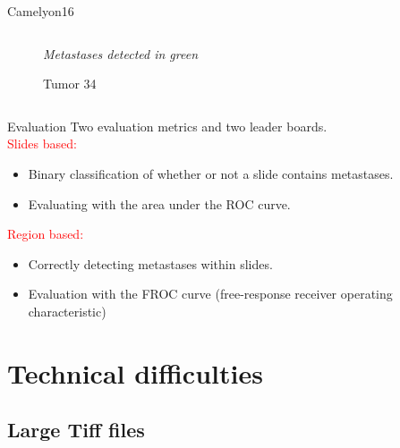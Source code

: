 \documentclass{beamer}
\begin{document}
\begin{frame}{Camelyon16}
\begin{columns}[T]
\begin{column}{.50\textwidth}
\begin{figure}[!ht]
\caption{Tumor 34}
{\footnotesize \textit{Metastases detected in green}}
\label{tumor_34}
\end{figure}
\end{column}%
\end{columns}

\end{frame}

\begin{frame}{Evaluation}
Two evaluation metrics and two leader boards. \\
\textcolor{red}{Slides based:}
\begin{itemize}
\item Binary classification of whether or not a slide contains metastases. \item Evaluating with the area under the ROC curve. 
\end{itemize}
\textcolor{red}{Region based:}
\begin{itemize}
\item Correctly detecting metastases within slides.
\item Evaluation with the FROC curve (free-response receiver operating characteristic)
\end{itemize}
\end{frame}

\section{Technical difficulties}

\subsection{Large Tiff files}
\end{document}
